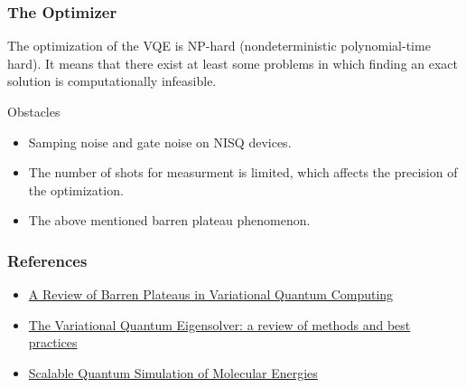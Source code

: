 \documentclass{beamer}
\begin{document}
\begin{frame}
    \frametitle{The Optimizer}
    The optimization of the VQE is NP-hard (nondeterministic polynomial-time hard). It means that there exist at least some problems in which finding an exact solution is computationally infeasible.
    \begin{alertblock}{Obstacles}
        \begin{itemize}
            \item Samping noise and gate noise on NISQ devices.
            \item The number of shots for measurment is limited, which affects the precision of the optimization.
            \item The above mentioned barren plateau phenomenon.
        \end{itemize}
    \end{alertblock}
\end{frame}
\begin{frame}
    \frametitle{References}
    \begin{itemize}
        \item \href{https://arxiv.org/pdf/2405.00781}{A Review of Barren Plateaus in Variational Quantum Computing}
        \item \href{https://arxiv.org/pdf/2111.05176}{The Variational Quantum Eigensolver: a review of methods and best practices}
        \item \href{https://journals.aps.org/prx/abstract/10.1103/PhysRevX.6.031007}{Scalable Quantum Simulation of Molecular Energies}
    \end{itemize}
\end{frame}
\end{document}
